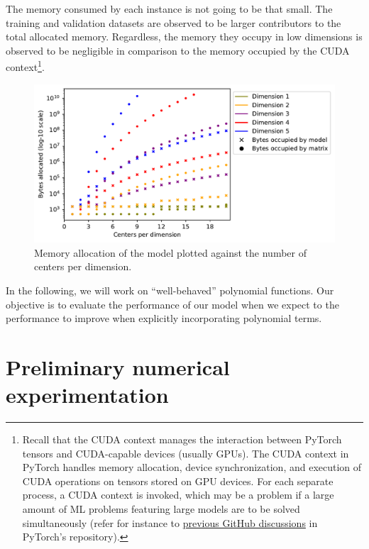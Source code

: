 \documentclass[12pt]{report} %
\begin{document}
The memory consumed by each instance is not going to be that small. The training and validation datasets are observed to be larger contributors to the total allocated memory. Regardless, the memory they occupy in low dimensions is observed to be negligible in comparison to the memory occupied by the CUDA context\footnote{Recall that the CUDA context manages the interaction between PyTorch tensors and CUDA-capable devices (usually GPUs). The CUDA context in PyTorch handles memory allocation, device synchronization, and execution of CUDA operations on tensors stored on GPU devices. For each separate process, a CUDA context is invoked, which may be a problem if a large amount of ML problems featuring large models are to be solved simultaneously  (refer for instance to \href{https://github.com/pytorch/pytorch/issues/20532}{previous GitHub discussions} in PyTorch's repository).}.


\begin{figure}
  \hspace*{-1.5cm}
  \includegraphics[width=1.2\textwidth]{imagenes/model_consumption/Memory_allocation_vs_number_of_centers_per_dimension.pdf}
  \caption{Memory allocation of the model plotted against the number of centers per dimension.}
  \label{fig:model-consumption-memory}
\end{figure}

In the following, we will work on ``well-behaved'' polynomial functions. Our objective is to evaluate the performance of our model when we expect to the performance to improve when explicitly incorporating polynomial terms. %

\chapter{Preliminary numerical experimentation}
\end{document}
